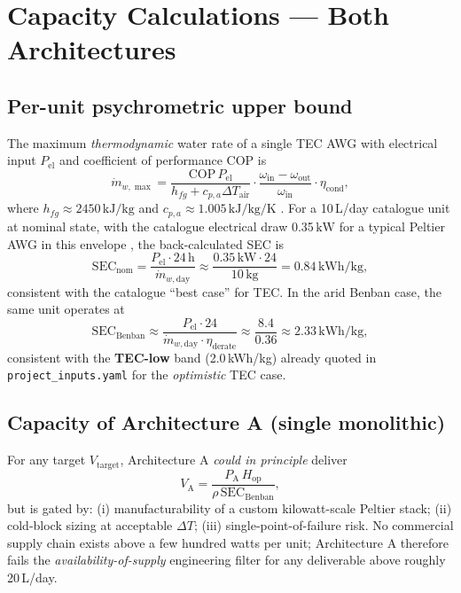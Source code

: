 \documentclass[11pt,a4paper]{article}
\newcommand{\SI}[2]{#1\,\ensuremath{\mathrm{#2}}}
\providecommand{\kilowatt}{kW}
\providecommand{\kelvin}{K}
\providecommand{\hour}{h}
\providecommand{\kilogram}{kg}
\providecommand{\kilo}{k}
\providecommand{\joule}{J}
\begin{document}
\section{Capacity Calculations --- Both Architectures}
\label{sec:capacity}

\subsection{Per-unit psychrometric upper bound}
The maximum \emph{thermodynamic} water rate of a single TEC AWG with electrical input $P_{\mathrm{el}}$ and coefficient of performance $\mathrm{COP}$ is
\begin{equation}
\dot{m}_{w,\max} = \frac{\mathrm{COP}\,P_{\mathrm{el}}}{h_{fg}+c_{p,a}\Delta T_{\mathrm{air}}}\cdot\frac{\omega_{\mathrm{in}}-\omega_{\mathrm{out}}}{\omega_{\mathrm{in}}}\cdot\eta_{\mathrm{cond}},
\label{eq:mdot_max}
\end{equation}
where $h_{fg}{\approx}\SI{2450}{\kilo\joule/\kilogram}$ and $c_{p,a}{\approx}\SI{1.005}{\kilo\joule/\kilogram/\kelvin}$ \citep{cengel2019thermo,ashrae2021psychro}. For a 10\,L/day catalogue unit at nominal state, with the catalogue electrical draw \SI{0.35}{\kilowatt} for a typical Peltier AWG in this envelope \citep{ecoloblue2024,commercial_awg_retail_2025,peltier_handbook_2018}, the back-calculated SEC is
\begin{equation}
\mathrm{SEC}_{\mathrm{nom}} = \frac{P_{\mathrm{el}}\cdot \SI{24}{\hour}}{\dot{m}_{w,\mathrm{day}}}
\approx \frac{\SI{0.35}{\kilowatt}\cdot 24}{\SI{10}{\kilogram}} = \SI{0.84}{\kilowatt\hour/\kilogram},
\end{equation}
consistent with the catalogue ``best case'' for TEC. In the arid Benban case, the same unit operates at
\begin{equation}
\mathrm{SEC}_{\mathrm{Benban}} \approx \frac{P_{\mathrm{el}}\cdot 24}{\dot{m}_{w,\mathrm{day}}\cdot \eta_{\mathrm{derate}}}
\approx \frac{8.4}{0.36}
\approx \SI{2.33}{\kilowatt\hour/\kilogram},
\end{equation}
consistent with the \textbf{TEC-low} band (2.0\,kWh/kg) already quoted in \texttt{project\_inputs.yaml} for the \emph{optimistic} TEC case.

\subsection{Capacity of Architecture A (single monolithic)}
For any target $V_{\mathrm{target}}$, Architecture A \emph{could in principle} deliver
\begin{equation}
V_{\mathrm{A}} = \frac{P_{\mathrm{A}}\,H_{\mathrm{op}}}{\rho\,\mathrm{SEC}_{\mathrm{Benban}}},
\end{equation}
but is gated by: (i) manufacturability of a custom kilowatt-scale Peltier stack; (ii) cold-block sizing at acceptable $\Delta T$; (iii) single-point-of-failure risk. No commercial supply chain exists above a few hundred watts per unit; Architecture A therefore fails the \emph{availability-of-supply} engineering filter for any deliverable above roughly 20\,L/day.
\end{document}
